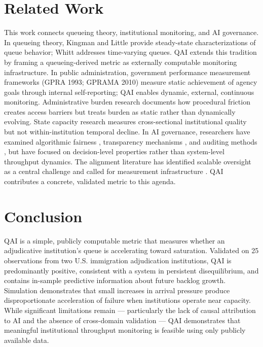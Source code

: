 \documentclass{article}
\begin{document}
\section{Related Work}

This work connects queueing theory, institutional monitoring, and AI governance. In queueing theory, Kingman \cite{kingman1961} and Little \cite{little1961} provide steady-state characterizations of queue behavior; Whitt \cite{whitt2018} addresses time-varying queues. QAI extends this tradition by framing a queueing-derived metric as externally computable monitoring infrastructure. In public administration, government performance measurement frameworks (GPRA 1993; GPRAMA 2010) measure static achievement of agency goals through internal self-reporting; QAI enables dynamic, external, continuous monitoring. Administrative burden research \cite{herd-moynihan2018} documents how procedural friction creates access barriers but treats burden as static rather than dynamically evolving. State capacity research \cite{fukuyama2013} measures cross-sectional institutional quality but not within-institution temporal decline. In AI governance, researchers have examined algorithmic fairness \cite{barocas2019}, transparency mechanisms \cite{selbst2019}, and auditing methods \cite{raji2020, metaxa2021}, but have focused on decision-level properties rather than system-level throughput dynamics. The alignment literature has identified scalable oversight as a central challenge \cite{amodei2016, bowman2022} and called for measurement infrastructure \cite{metr2024}. QAI contributes a concrete, validated metric to this agenda.

\section{Conclusion}

QAI is a simple, publicly computable metric that measures whether an adjudicative institution's queue is accelerating toward saturation. Validated on 25 observations from two U.S. immigration adjudication institutions, QAI is predominantly positive, consistent with a system in persistent disequilibrium, and contains in-sample predictive information about future backlog growth. Simulation demonstrates that small increases in arrival pressure produce disproportionate acceleration of failure when institutions operate near capacity. While significant limitations remain — particularly the lack of causal attribution to AI and the absence of cross-domain validation — QAI demonstrates that meaningful institutional throughput monitoring is feasible using only publicly available data.



\end{document}
